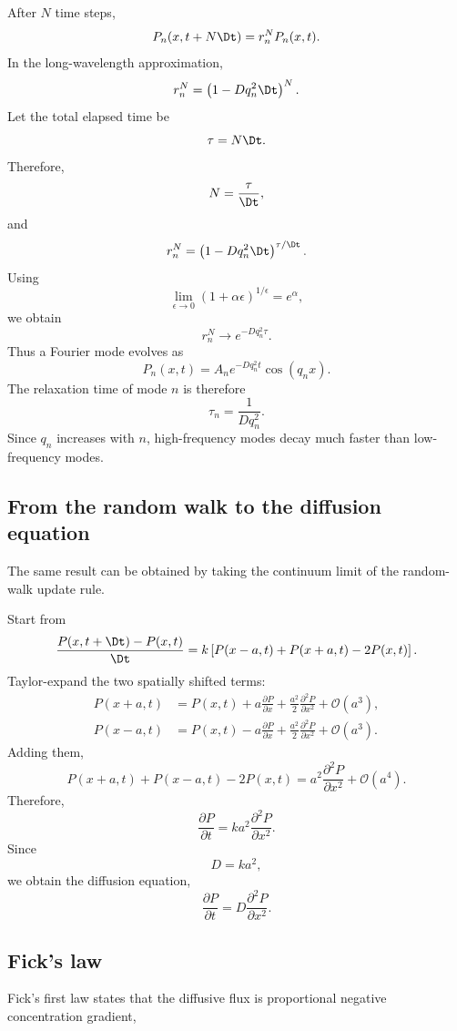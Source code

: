 After $N$ time steps,
% 
\[
    P_n(x,t+N\Dt) = r_n^N P_n(x,t).
\]
% 
In the long-wavelength approximation,
% 
\[
    r_n^N = \left( 1-Dq_n^2\Dt \right)^N.
\]
% 
Let the total elapsed time be
% 
\[
    \tau = N\Dt.
\]
% 
Therefore,
% 
\[
    N = \frac{\tau}{\Dt},
\]
% 
and
% 
\[
    r_n^N = \left( 1-Dq_n^2\Dt \right)^{\tau/\Dt}.
\]
% 
Using
% 
\[
    \lim_{\epsilon\rightarrow0} (1+\alpha\epsilon)^{1/\epsilon} = e^\alpha,
\]
% 
we obtain
% 
\[
    \boxed{
        r_n^N \longrightarrow e^{-Dq_n^2\tau}.
    }
\]
% 
Thus a Fourier mode evolves as
% 
\[
    \boxed{
        P_n(x,t) = A_n e^{-Dq_n^2t} \cos(q_nx).
    }
\]
% 
The relaxation time of mode $n$ is therefore
% 
\[
    \tau_n = \frac{1}{Dq_n^2}.
\]
% 
Since $q_n$ increases with $n$, high-frequency modes decay much faster than low-frequency modes.


\subsection{From the random walk to the diffusion equation}

The same result can be obtained by taking the continuum limit of the random-walk update rule.

Start from
% 
\[
    \frac{P(x,t+\Dt)-P(x,t)}{\Dt} = k \left[ P(x-a,t) + P(x+a,t) - 2P(x,t) \right].
\]
% 
Taylor-expand the two spatially shifted terms:
% 
\begin{align*}
    P(x+a,t) &= P(x,t) + a\frac{\partial P}{\partial x} + \frac{a^2}{2} \frac{\partial^2P}{\partial x^2} + \mathcal{O}(a^3),
    \\
    P(x-a,t) &= P(x,t) - a\frac{\partial P}{\partial x} + \frac{a^2}{2} \frac{\partial^2P}{\partial x^2} + \mathcal{O}(a^3).
\end{align*}
% 
Adding them,
% 
\[
    P(x+a,t) + P(x-a,t) - 2P(x,t) = a^2 \frac{\partial^2P}{\partial x^2} + \mathcal{O}(a^4).
\]
% 
Therefore,
% 
\[
    \frac{\partial P}{\partial t} = ka^2 \frac{\partial^2P}{\partial x^2}.
\]
% 
Since
% 
\[
    D = ka^2,
\]
% 
we obtain the diffusion equation,
% 
\[
    \boxed{
        \frac{\partial P}{\partial t} = D\frac{\partial^2P}{\partial x^2}.
    }
\]


\subsection{Fick's law}

Fick's first law states that the diffusive flux is proportional  negative concentration gradient,

